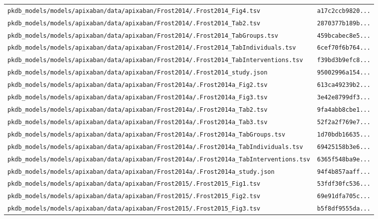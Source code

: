 \begin{longtable}{ll}
\texttt{pkdb\_models/models/apixaban/data/apixaban/Frost2014/.Frost2014\_Fig4.tsv} & \texttt{a17c2ccb9820...} \\
\texttt{pkdb\_models/models/apixaban/data/apixaban/Frost2014/.Frost2014\_Tab2.tsv} & \texttt{2870377b189b...} \\
\texttt{pkdb\_models/models/apixaban/data/apixaban/Frost2014/.Frost2014\_TabGroups.tsv} & \texttt{459bcabec8e5...} \\
\texttt{pkdb\_models/models/apixaban/data/apixaban/Frost2014/.Frost2014\_TabIndividuals.tsv} & \texttt{6cef70f6b764...} \\
\texttt{pkdb\_models/models/apixaban/data/apixaban/Frost2014/.Frost2014\_TabInterventions.tsv} & \texttt{f39bd3b9efc8...} \\
\texttt{pkdb\_models/models/apixaban/data/apixaban/Frost2014/.Frost2014\_study.json} & \texttt{95002996a154...} \\
\texttt{pkdb\_models/models/apixaban/data/apixaban/Frost2014a/.Frost2014a\_Fig2.tsv} & \texttt{613ca49239b2...} \\
\texttt{pkdb\_models/models/apixaban/data/apixaban/Frost2014a/.Frost2014a\_Fig3.tsv} & \texttt{3e42e8799df3...} \\
\texttt{pkdb\_models/models/apixaban/data/apixaban/Frost2014a/.Frost2014a\_Tab2.tsv} & \texttt{9fa4abb8cbe1...} \\
\texttt{pkdb\_models/models/apixaban/data/apixaban/Frost2014a/.Frost2014a\_Tab3.tsv} & \texttt{52f2a2f769e7...} \\
\texttt{pkdb\_models/models/apixaban/data/apixaban/Frost2014a/.Frost2014a\_TabGroups.tsv} & \texttt{1d70bdb16635...} \\
\texttt{pkdb\_models/models/apixaban/data/apixaban/Frost2014a/.Frost2014a\_TabIndividuals.tsv} & \texttt{69425158b3e6...} \\
\texttt{pkdb\_models/models/apixaban/data/apixaban/Frost2014a/.Frost2014a\_TabInterventions.tsv} & \texttt{6365f548ba9e...} \\
\texttt{pkdb\_models/models/apixaban/data/apixaban/Frost2014a/.Frost2014a\_study.json} & \texttt{94f4b857aaff...} \\
\texttt{pkdb\_models/models/apixaban/data/apixaban/Frost2015/.Frost2015\_Fig1.tsv} & \texttt{53fdf30fc536...} \\
\texttt{pkdb\_models/models/apixaban/data/apixaban/Frost2015/.Frost2015\_Fig2.tsv} & \texttt{69e91dfa705c...} \\
\texttt{pkdb\_models/models/apixaban/data/apixaban/Frost2015/.Frost2015\_Fig3.tsv} & \texttt{b5f8df9555da...} \\

\end{longtable}

